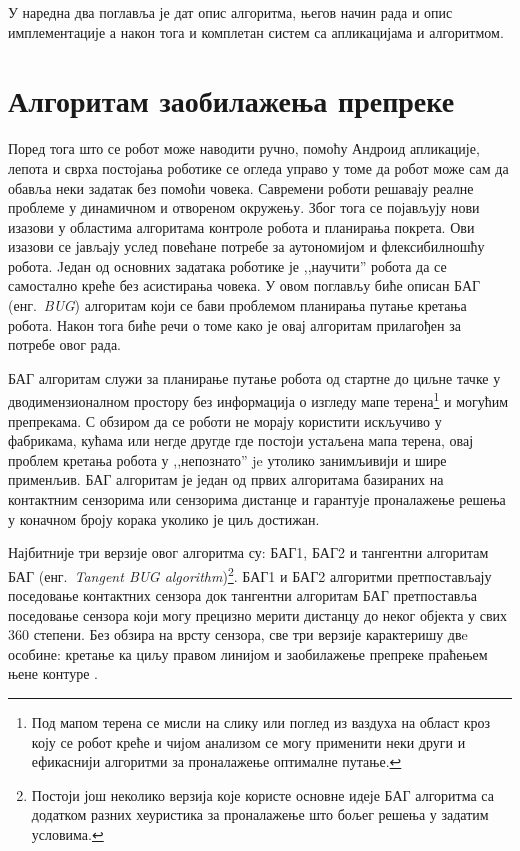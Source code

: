 \documentclass[12pt,oneside]{memoir}
\theoremstyle{remark}
\begin{document}
У наредна два поглавља је дат опис алгоритма, његов начин рада и опис имплементације а након тога и комплетан систем са апликацијама и алгоритмом.

\chapter{Алгоритам заобилажења препреке}
\label{chp:algoritam}
Поред тога што се робот може наводити ручно, помоћу Андроид апликације, лепота и сврха постојања роботике се огледа управо у томе да робот може сам да обавља неки задатак без помоћи човека. Савремени роботи решавају реалне проблеме у динамичном и отвореном окружењу. Због тога се појављују нови изазови у областима алгоритама контроле робота и планирања покрета. Ови изазови се јављају услед повећане потребе за аутономијом и флексибилношћу робота. Jедан од основних задатака роботике је ,,научити'' робота да се самостално креће без асистирања човека. У овом поглављу биће описан БАГ (енг.~{\em BUG}) алгоритам који се бави проблемом планирања путање кретања робота. Након тога биће речи о томе како је овај алгоритам прилагођен за потребе овог рада.

БАГ алгоритам служи за планирање путање робота од стартне до циљне тачке у дводимензионалном простору без информација о изгледу мапе терена\footnote{Под мапом терена се мисли на слику или поглед из ваздуха на област кроз коју се робот креће и чијом анализом се могу применити неки други и ефикаснији алгоритми за проналажење оптималне путање.} и могућим препрекама. С обзиром да се роботи не морају користити искључиво у фабрикама, кућама или негде другде где постоји устаљена мапа терена, овај проблем кретања робота у ,,непознато'' je утолико занимљивији и шире применљив. БАГ алгоритам је један од првих алгоритама  базираних на контактним сензорима или сензорима дистанце и гарантује проналажење решења у коначном броју корака уколико је циљ достижан. 

Најбитније три верзије овог алгоритма су: БАГ1, БАГ2 и тангентни алгоритам БАГ (енг.~{\em Tangent BUG algorithm})\footnote{Постоји још неколико верзија које користе основне идеје БАГ алгоритма са додатком разних хеуристика за проналажење што бољег решења у задатим условима.}. БАГ1 и БАГ2 алгоритми претпостављају поседовање контактних сензора док тангентни алгоритам БАГ претпоставља поседовање сензора који могу прецизно мерити дистанцу до неког објекта у свих 360 степени. Без обзира на врсту сензора, све три верзије карактеришу двe особине: кретање ка циљу правом линијом и заобилажење препреке праћењем њене контуре \cite{principlesofrobotmotion}. 
\end{document}
